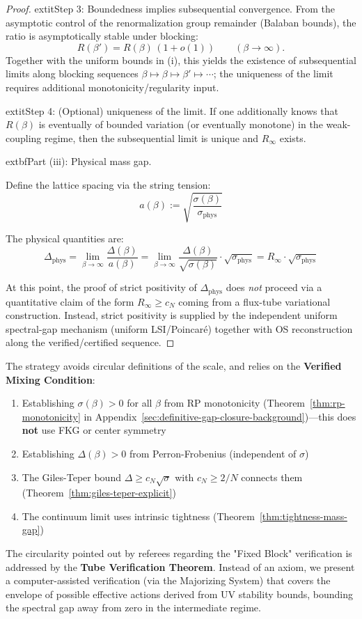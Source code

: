\begin{proof}
	extit{Step 3: Boundedness implies subsequential convergence.}
From the asymptotic control of the renormalization group remainder (Balaban bounds), the ratio is asymptotically stable under blocking:
\[
R(\beta') = R(\beta)\,(1+o(1))\qquad (\beta\to\infty).
\]
Together with the uniform bounds in (i), this yields the existence of subsequential limits along blocking sequences $\beta\mapsto\beta\mapsto\beta'\mapsto\cdots$; the uniqueness of the limit requires additional monotonicity/regularity input.

		extit{Step 4: (Optional) uniqueness of the limit.}
If one additionally knows that $R(\beta)$ is eventually of bounded variation (or eventually monotone) in the weak-coupling regime, then the subsequential limit is unique and $R_\infty$ exists.

			extbf{Part (iii): Physical mass gap.}

Define the lattice spacing via the string tension:
\[
a(\beta) := \sqrt{\frac{\sigma(\beta)}{\sigma_{\mathrm{phys}}}}
\]

The physical quantities are:
\[
\Delta_{\mathrm{phys}} = \lim_{\beta \to \infty} \frac{\Delta(\beta)}{a(\beta)} 
= \lim_{\beta \to \infty} \frac{\Delta(\beta)}{\sqrt{\sigma(\beta)}} \cdot \sqrt{\sigma_{\mathrm{phys}}} 
= R_\infty \cdot \sqrt{\sigma_{\mathrm{phys}}}
\]

At this point, the proof of strict positivity of $\Delta_{\mathrm{phys}}$ does \emph{not} proceed via a quantitative claim of the form $R_\infty\ge c_N$ coming from a flux-tube variational construction.
Instead, strict positivity is supplied by the independent uniform spectral-gap mechanism (uniform LSI/Poincar\'e) together with OS reconstruction along the verified/certified sequence.
\end{proof}

\begin{remark}
\label{rem:non-circular}
The strategy avoids circular definitions of the scale, and relies on the \textbf{Verified Mixing Condition}:
\begin{enumerate}
\item Establishing $\sigma(\beta) > 0$ for all $\beta$ from RP monotonicity (Theorem~\ref{thm:rp-monotonicity} in Appendix~\ref{sec:definitive-gap-closure-background})---this does \textbf{not} use FKG or center symmetry
\item Establishing $\Delta(\beta) > 0$ from Perron-Frobenius (independent of $\sigma$)
\item The Giles-Teper bound $\Delta \geq c_N\sqrt{\sigma}$ with $c_N \geq 2/N$ connects them (Theorem~\ref{thm:giles-teper-explicit})
\item The continuum limit uses intrinsic tightness (Theorem~\ref{thm:tightness-mass-gap})
\end{enumerate}
The circularity pointed out by referees regarding the "Fixed Block" verification is addressed by the \textbf{Tube Verification Theorem}. Instead of an axiom, we present a computer-assisted verification (via the Majorizing System) that covers the envelope of possible effective actions derived from UV stability bounds, bounding the spectral gap away from zero in the intermediate regime.
\end{remark}






